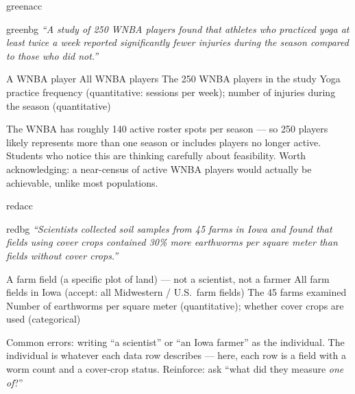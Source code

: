 \documentclass[10pt]{article}
\begin{document}
\begin{blurbbox}[Study 2]{greenacc}
\begin{headlinebox}{greenbg}
\small\textit{``A study of 250 WNBA players found that athletes who practiced
yoga at least twice a week reported significantly fewer injuries during the season
compared to those who did not.''}
\end{headlinebox}

\vspace{8pt}
\componenttablekey
  {A WNBA player}
  {All WNBA players}
  {The 250 WNBA players in the study}
  {Yoga practice frequency (quantitative: sessions per week); number of injuries during the season (quantitative)}

\vspace{6pt}
\begin{teachernote}
\scriptsize
The WNBA has roughly 140 active roster spots per season — so 250 players likely represents
more than one season or includes players no longer active. Students who notice this are
thinking carefully about feasibility. Worth acknowledging: a near-census of active WNBA
players would actually be achievable, unlike most populations.
\end{teachernote}
\end{blurbbox}

\vspace{0.12in}

\begin{blurbbox}[Study 3]{redacc}
\begin{headlinebox}{redbg}
\small\textit{``Scientists collected soil samples from 45 farms in Iowa and
found that fields using cover crops contained 30\% more earthworms per square
meter than fields without cover crops.''}
\end{headlinebox}

\vspace{8pt}
\componenttablekey
  {A farm field (a specific plot of land) --- not a scientist, not a farmer}
  {All farm fields in Iowa (accept: all Midwestern / U.S.\ farm fields)}
  {The 45 farms examined}
  {Number of earthworms per square meter (quantitative); whether cover crops are used (categorical)}

\vspace{6pt}
\begin{teachernote}
\scriptsize
Common errors: writing ``a scientist'' or ``an Iowa farmer'' as the individual.
The individual is whatever each data row describes — here, each row is a field with
a worm count and a cover-crop status. Reinforce: ask ``what did they measure \emph{one of}?''
\end{teachernote}
\end{blurbbox}
\end{document}
